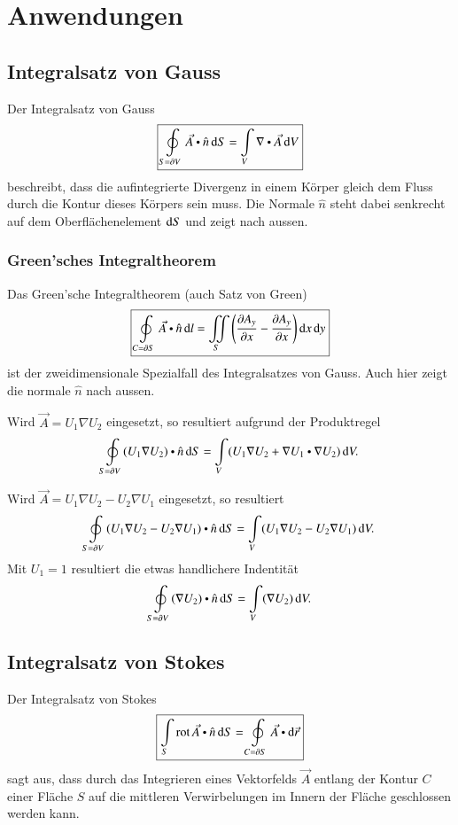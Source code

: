 
\section{Anwendungen}

\subsection{Integralsatz von Gauss}
Der Integralsatz von Gauss 
\[
    \boxed{\oint\limits_{S = \partial V} \vec{A} \dotp \hat{n} \diff S = \int\limits_{V} \nabla \dotp \vec{A} \diff V}
\]
beschreibt, dass die aufintegrierte Divergenz in einem Körper gleich dem Fluss durch die Kontur dieses Körpers sein muss.
Die Normale $\hat{n}$ steht dabei senkrecht auf dem Oberflächenelement $\mathop{} \! \mathrm{d} S$ und zeigt nach aussen.

\subsubsection{Green'sches Integraltheorem}
Das Green'sche Integraltheorem (auch Satz von Green) 
\[
    \boxed{\oint\limits_{C = \partial S} \vec{A} \dotp \hat{n} \diff l = \iint\limits_{S} \left(\frac{\partial A_y}{\partial x}-\frac{\partial A_y}{\partial x}\right) \diff x \diff y }
\]
ist der zweidimensionale Spezialfall des Integralsatzes von Gauss. Auch hier zeigt die normale $\hat{n}$ nach aussen.

Wird $\vec{A} = U_1 \nabla U_2$ eingesetzt, so resultiert aufgrund der Produktregel
\[
    \oint\limits_{S = \partial V} (U_1 \nabla U_2) \dotp \hat{n} \diff S = \int\limits_{V} (U_1 \nabla U_2 + \nabla U_1 \dotp \nabla U_2) \diff V.
\]

Wird $\vec{A} = U_1 \nabla U_2 - U_2 \nabla U_1 $ eingesetzt, so resultiert
\[
    \oint\limits_{S = \partial V} (U_1 \nabla U_2 - U_2 \nabla U_1) \dotp \hat{n} \diff S = \int\limits_{V} (U_1 \nabla U_2 - U_2 \nabla U_1) \diff V.
\]
Mit $U_1 = 1$ resultiert die etwas handlichere Indentität
\[
    \oint\limits_{S = \partial V} (\nabla U_2) \dotp \hat{n} \diff S = \int\limits_{V} (\nabla U_2) \diff V.
\]

\subsection{Integralsatz von Stokes}
Der Integralsatz von Stokes
\[
    \boxed{\int\limits_{S} \rot \vec{A} \dotp \hat{n} \diff S = \oint\limits_{C = \partial S} \vec{A} \dotp \diff \vec{r}}
\]
sagt aus, dass durch das Integrieren eines Vektorfelds $\vec{A}$ entlang der Kontur $C$ einer Fläche $S$ auf die mittleren Verwirbelungen im Innern der Fläche geschlossen werden kann.

